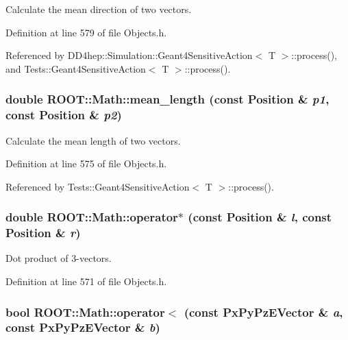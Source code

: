 Calculate the mean direction of two vectors. 

Definition at line 579 of file Objects.h.

Referenced by DD4hep::Simulation::Geant4SensitiveAction$<$ T $>$::process(), and Tests::Geant4SensitiveAction$<$ T $>$::process().\hypertarget{namespace_r_o_o_t_1_1_math_ae1d6c364099dacd36db12d2ece5adb9c}{
\subsubsection[{mean\_\-length}]{\setlength{\rightskip}{0pt plus 5cm}double ROOT::Math::mean\_\-length (const Position \& {\em p1}, \/  const Position \& {\em p2})}}
\label{namespace_r_o_o_t_1_1_math_ae1d6c364099dacd36db12d2ece5adb9c}


Calculate the mean length of two vectors. 

Definition at line 575 of file Objects.h.

Referenced by Tests::Geant4SensitiveAction$<$ T $>$::process().\hypertarget{namespace_r_o_o_t_1_1_math_ad7a11e4384dc9dcc6a3e4e892391f26b}{
\subsubsection[{operator$\ast$}]{\setlength{\rightskip}{0pt plus 5cm}double ROOT::Math::operator$\ast$ (const Position \& {\em l}, \/  const Position \& {\em r})}}
\label{namespace_r_o_o_t_1_1_math_ad7a11e4384dc9dcc6a3e4e892391f26b}


Dot product of 3-\/vectors. 

Definition at line 571 of file Objects.h.\hypertarget{namespace_r_o_o_t_1_1_math_a1c3af6f88f23ab799472c3e6621364ea}{
\subsubsection[{operator$<$}]{\setlength{\rightskip}{0pt plus 5cm}bool ROOT::Math::operator$<$ (const PxPyPzEVector \& {\em a}, \/  const PxPyPzEVector \& {\em b})}}
\label{namespace_r_o_o_t_1_1_math_a1c3af6f88f23ab799472c3e6621364ea}


